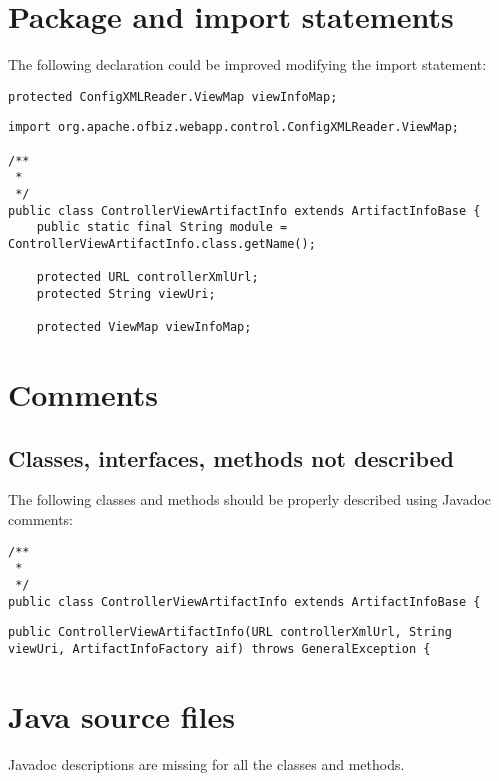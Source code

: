 \section{Package and import statements}
The following declaration could be improved modifying the import statement:
\begin{lstlisting}[firstnumber=41, caption={Line 41 issue}]
protected ConfigXMLReader.ViewMap viewInfoMap;
\end{lstlisting}

\begin{lstlisting}[firstnumber=30, caption={Line 41 possible solution}]
import org.apache.ofbiz.webapp.control.ConfigXMLReader.ViewMap;

/**
 *
 */
public class ControllerViewArtifactInfo extends ArtifactInfoBase {
    public static final String module = ControllerViewArtifactInfo.class.getName();

    protected URL controllerXmlUrl;
    protected String viewUri;

    protected ViewMap viewInfoMap;
\end{lstlisting}

\section{Comments}
\subsection{Classes, interfaces, methods not described}
The following classes and methods should be properly described using Javadoc comments:
\begin{lstlisting}[firstnumber=32, caption={ControllerViewArtifactInfo class description missing}]
/**
 *
 */
public class ControllerViewArtifactInfo extends ArtifactInfoBase {
\end{lstlisting}

\begin{lstlisting}[firstnumber=44, caption={Constructor description missing}]
public ControllerViewArtifactInfo(URL controllerXmlUrl, String viewUri, ArtifactInfoFactory aif) throws GeneralException {
\end{lstlisting}

\section{Java source files}
Javadoc descriptions are missing for all the classes and methods.

